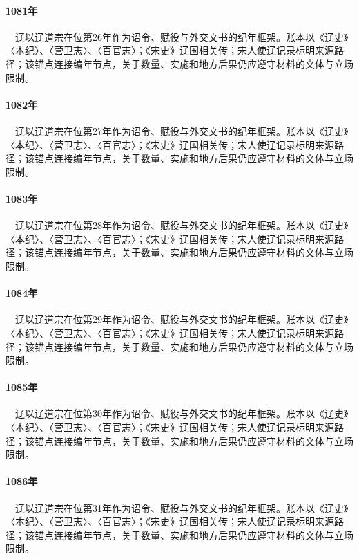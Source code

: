 \paragraph{1081年}　辽以辽道宗在位第26年作为诏令、赋役与外交文书的纪年框架。账本以《辽史》〈本纪〉、〈营卫志〉、〈百官志〉；《宋史》辽国相关传；宋人使辽记录标明来源路径；该锚点连接编年节点，关于数量、实施和地方后果仍应遵守材料的文体与立场限制。

\paragraph{1082年}　辽以辽道宗在位第27年作为诏令、赋役与外交文书的纪年框架。账本以《辽史》〈本纪〉、〈营卫志〉、〈百官志〉；《宋史》辽国相关传；宋人使辽记录标明来源路径；该锚点连接编年节点，关于数量、实施和地方后果仍应遵守材料的文体与立场限制。

\paragraph{1083年}　辽以辽道宗在位第28年作为诏令、赋役与外交文书的纪年框架。账本以《辽史》〈本纪〉、〈营卫志〉、〈百官志〉；《宋史》辽国相关传；宋人使辽记录标明来源路径；该锚点连接编年节点，关于数量、实施和地方后果仍应遵守材料的文体与立场限制。

\paragraph{1084年}　辽以辽道宗在位第29年作为诏令、赋役与外交文书的纪年框架。账本以《辽史》〈本纪〉、〈营卫志〉、〈百官志〉；《宋史》辽国相关传；宋人使辽记录标明来源路径；该锚点连接编年节点，关于数量、实施和地方后果仍应遵守材料的文体与立场限制。

\paragraph{1085年}　辽以辽道宗在位第30年作为诏令、赋役与外交文书的纪年框架。账本以《辽史》〈本纪〉、〈营卫志〉、〈百官志〉；《宋史》辽国相关传；宋人使辽记录标明来源路径；该锚点连接编年节点，关于数量、实施和地方后果仍应遵守材料的文体与立场限制。

\paragraph{1086年}　辽以辽道宗在位第31年作为诏令、赋役与外交文书的纪年框架。账本以《辽史》〈本纪〉、〈营卫志〉、〈百官志〉；《宋史》辽国相关传；宋人使辽记录标明来源路径；该锚点连接编年节点，关于数量、实施和地方后果仍应遵守材料的文体与立场限制。

